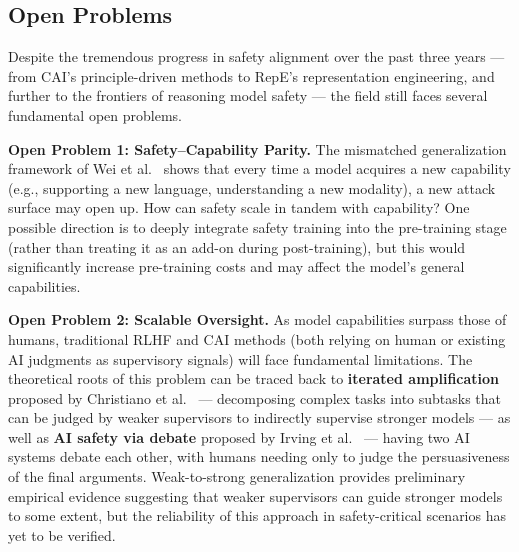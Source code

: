 
\subsection{Open Problems}
\label{sec:t3-open}

Despite the tremendous progress in safety alignment over the past three years ---
from CAI's principle-driven methods to RepE's representation engineering, and further to the frontiers of reasoning model safety ---
the field still faces several fundamental open problems.

\begin{openproblembox}
\textbf{Open Problem 1: Safety--Capability Parity.}
The mismatched generalization framework of Wei et al.\ \cite{wei2023jailbroken} shows that
every time a model acquires a new capability (e.g., supporting a new language, understanding a new modality),
a new attack surface may open up.
How can safety scale in tandem with capability?
One possible direction is to deeply integrate safety training into the pre-training stage
(rather than treating it as an add-on during post-training),
but this would significantly increase pre-training costs and may affect the model's general capabilities.
\end{openproblembox}

\begin{openproblembox}
\textbf{Open Problem 2: Scalable Oversight.}
As model capabilities surpass those of humans,
traditional RLHF and CAI methods (both relying on human or existing AI judgments as supervisory signals)
will face fundamental limitations.
The theoretical roots of this problem can be traced back to
\textbf{iterated amplification} proposed by Christiano et al.\ \cite{christiano2018oversight} ---
decomposing complex tasks into subtasks that can be judged by weaker supervisors to indirectly supervise stronger models ---
as well as \textbf{AI safety via debate} proposed by Irving et al.\ \cite{irving2018debate} ---
having two AI systems debate each other, with humans needing only to judge the persuasiveness of the final arguments.
Weak-to-strong generalization \cite{burns2023weaktostrong} provides preliminary empirical evidence
suggesting that weaker supervisors can guide stronger models to some extent,
but the reliability of this approach in safety-critical scenarios has yet to be verified.
\end{openproblembox}

